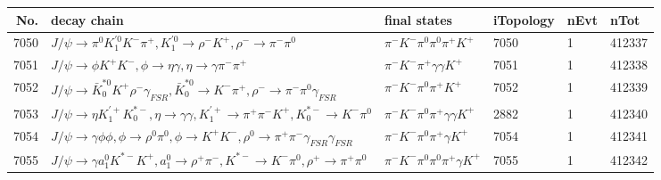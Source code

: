 \begin{table}[htbp] 
\begin{center}
\begin{small}
\begin{tabular}{rlllll}\hline\hline
 No. & decay chain & final states &  iTopology & nEvt & nTot \\\hline
7050&$J/\psi       \rightarrow \pi^{0}        K_1^{'0}      K^{-}          \pi^{+}        , K_1^{'0}       \rightarrow \rho^{-}      K^{+}          , \rho^{-}       \rightarrow \pi^{-}        \pi^{0}        $&$\pi^{-}        K^{-}          \pi^{0}        \pi^{0}        \pi^{+}        K^{+}          $& 7050&    1&412337\\
7051&$J/\psi       \rightarrow \phi           K^{+}          K^{-}          , \phi            \rightarrow \eta          \gamma       , \eta           \rightarrow \gamma       \pi^{-}        \pi^{+}        $&$\pi^{-}        K^{-}          \pi^{+}        \gamma       \gamma       K^{+}          $& 7051&    1&412338\\
7052&$J/\psi       \rightarrow \bar{K}_0^{*0}K^{+}          \rho^{-}      \gamma_{FSR} , \bar{K}_0^{*0} \rightarrow K^{-}          \pi^{+}        , \rho^{-}       \rightarrow \pi^{-}        \pi^{0}        \gamma_{FSR} $&$\pi^{-}        K^{-}          \pi^{0}        \pi^{+}        K^{+}          $& 7052&    1&412339\\
7053&$J/\psi       \rightarrow \eta          K_1^{'+}      K_{0}^{*-}     , \eta           \rightarrow \gamma       \gamma       , K_1^{'+}       \rightarrow \pi^{+}        \pi^{-}        K^{+}          , K_{0}^{*-}      \rightarrow K^{-}          \pi^{0}        $&$\pi^{-}        K^{-}          \pi^{0}        \pi^{+}        \gamma       \gamma       K^{+}          $& 2882&    1&412340\\
7054&$J/\psi       \rightarrow \gamma       \phi           \phi           , \phi            \rightarrow \rho^{0}      \pi^{0}        , \phi            \rightarrow K^{+}          K^{-}          , \rho^{0}       \rightarrow \pi^{+}        \pi^{-}        \gamma_{FSR} \gamma_{FSR} $&$\pi^{-}        K^{-}          \pi^{0}        \pi^{+}        \gamma       K^{+}          $& 7054&    1&412341\\
7055&$J/\psi       \rightarrow \gamma       a_{1}^{0}      K^{*-}         K^{+}          , a_{1}^{0}       \rightarrow \rho^{+}      \pi^{-}        , K^{*-}          \rightarrow K^{-}          \pi^{0}        , \rho^{+}       \rightarrow \pi^{+}        \pi^{0}        $&$\pi^{-}        K^{-}          \pi^{0}        \pi^{0}        \pi^{+}        \gamma       K^{+}          $& 7055&    1&412342\\

\end{tabular}
\end{small}
\end{center}
\end{table}
